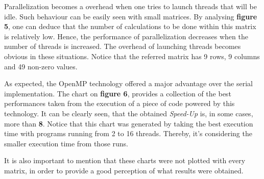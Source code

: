 \documentclass[12pt]{article}
\begin{document}
\par Parallelization becomes a overhead when one tries to launch threads that will be idle. Such behaviour can be easily seen with small matrices. By analysing \textbf{figure 5}, one can deduce that the number of calculations to be done within this matrix is relatively low. Hence, the performance of parallelization decreases when the number of threads is increased. The overhead of launching threads becomes obvious in these situations. Notice that the referred matrix has 9 rows, 9 columns and 49 non-zero values.
\par As expected, the OpenMP technology offered a major advantage over the serial implementation. The chart on \textbf{figure 6}, provides a collection of the best performances taken from the execution of a piece of code powered by this technology. It can be clearly seen, that the obtained \textit{Speed-Up} is, in some cases, more than \textbf{8}. Notice that this chart was generated by taking the best execution time with programs running from 2 to 16 threads. Thereby, it's considering the smaller execution time from those runs. 
\par It is also important to mention that these charts were not plotted with every matrix, in order to provide a good perception of what results were obtained.
\end{document}
